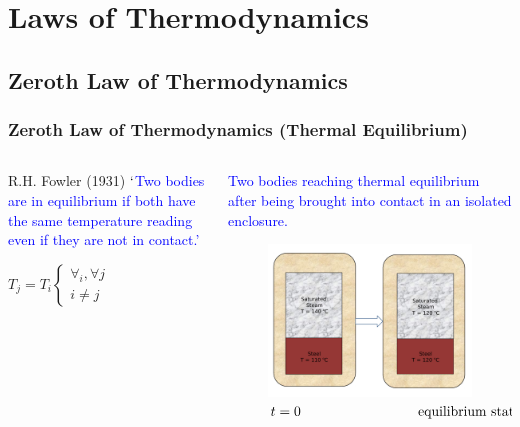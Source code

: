 \documentclass[10pt,compress]{beamer}
\begin{document}

\section{Laws of Thermodynamics}


\subsection{Zeroth Law of Thermodynamics}

\begin{frame}
 \frametitle{Zeroth Law of Thermodynamics (Thermal Equilibrium)}

 \begin{columns}
  \begin{column}[r]{0.4\linewidth}
   \begin{block}{R.H. Fowler (1931)}
   \textcolor{blue}{$\lq$Two bodies are in equilibrium if both have the same temperature reading even if they are not in contact.'}
   \end{block}
    $ T_{j} = T_{i}
    \begin{cases}
     \forall_{i}, \forall{j} \\
     i \neq j
    \end{cases}$
  \end{column}
  
  \begin{column}[c]{0.6\linewidth}
\scriptsize \textcolor{blue}{Two bodies reaching thermal equilibrium after being brought into contact in an isolated enclosure.}
   \begin{figure}%
    \begin{center}
     \includegraphics[width=\columnwidth,clip]{./../Pics/zeroth_law}\\
      \scriptsize \textcolor{blue}{$t = 0 \hspace{3.cm} \text{equilibrium state}$}
    \end{center}
   \end{figure}
  \end{column}
 \end{columns}


\end{frame}
\end{document}
